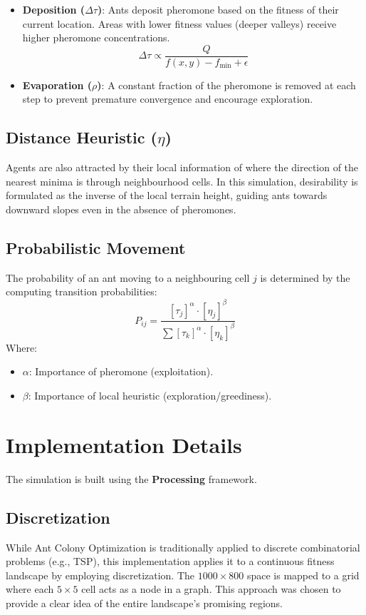 \documentclass[12pt]{article}
\begin{document}
\begin{itemize}
    \item \textbf{Deposition ($\Delta \tau$)}: Ants deposit pheromone based on the fitness of their current location. Areas with lower fitness values (deeper valleys) receive higher pheromone concentrations.
    \begin{equation}
        \Delta \tau \propto \frac{Q}{f(x, y) - f_{\min} + \epsilon}
    \end{equation}
    \item \textbf{Evaporation ($\rho$)}: A constant fraction of the pheromone is removed at each step to prevent premature convergence and encourage exploration.
\end{itemize}

\subsection{Distance Heuristic ($\eta$)}
Agents are also attracted by their local information of where the direction of the nearest minima is through neighbourhood cells. In this simulation, desirability is formulated as the inverse of the local terrain height, guiding ants towards downward slopes even in the absence of pheromones.

\subsection{Probabilistic Movement}
The probability of an ant moving to a neighbouring cell $j$ is determined by the computing transition probabilities:
\begin{equation}
    P_{ij} = \frac{[\tau_j]^\alpha \cdot [\eta_j]^\beta}{\sum [\tau_k]^\alpha \cdot [\eta_k]^\beta}
\end{equation}
Where:
\begin{itemize}
    \item $\alpha$: Importance of pheromone (exploitation).
    \item $\beta$: Importance of local heuristic (exploration/greediness).
\end{itemize}

\section{Implementation Details}
The simulation is built using the \textbf{Processing} framework.

\subsection{Discretization}
While Ant Colony Optimization is traditionally applied to discrete combinatorial problems (e.g., TSP), this implementation applies it to a continuous fitness landscape by employing discretization. The $1000 \times 800$ space is mapped to a grid where each $5 \times 5$ cell acts as a node in a graph. This approach was chosen to provide a clear idea of the entire landscape's promising regions.
\end{document}
